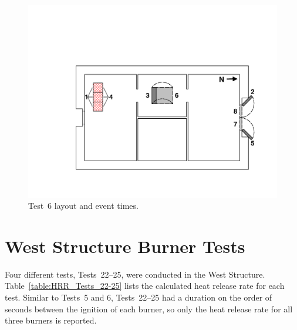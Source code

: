 \begin{figure}[!ht]
\begin{minipage}[b]{0.98\columnwidth}
\begin{center}
\end{center}
\end{minipage}
\begin{minipage}[b]{\columnwidth}
	\vspace{20pt}
	\centering
	\includegraphics[width=0.8\columnwidth]{Figures/Floor_Plans/East_Structure_Test_6}
\end{minipage}
\renewcommand{\baselinestretch}{1}
\caption{Test~6 layout and event times.}
\label{fig:east_test_6}
\end{figure}
\clearpage
\renewcommand{\baselinestretch}{2}

\section{West Structure Burner Tests}

Four different tests, Tests~22--25, were conducted in the West Structure. Table~\ref{table:HRR_Tests_22-25} lists the calculated heat release rate for each test. Similar to Tests~5 and 6, Tests~22--25 had a duration on the order of seconds between the ignition of each burner, so only the heat release rate for all three burners is reported.

